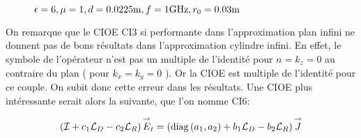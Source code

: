 \begin{figure}[!hbt]
          \caption[CIOE sur empilement de Hoppe & Rahmat-Samii p.~62]{\(\epsilon = 6, \mu = 1, d=0.0225\text{m}, f=1\text{GHz}, r_0=0.03\text{m}\)}
          \label{fig:imp_fourier:plan:hoppe:62:hoibc}
      \end{figure}


    On remarque que le CIOE CI3 si performante dans l'approximation plan infini ne donnent pas de bons résultats dans l’approximation cylindre infini. En effet, le symbole de l'opérateur n'est pas un multiple de l'identité pour \(n=k_z=0\) au contraire du plan ( pour \(k_x=k_y=0\) ). Or la CIOE est multiple de l'identité pour ce couple. On subit donc cette erreur dans les résultats. Une CIOE plus intéressante serait alors la suivante, que l'on nomme CI6:

    \begin{equation}
      \left({\mathcal{I}} + c_1{\mathcal{L}_D} -c_2{\mathcal{L}_R}\right){\overset{\rightarrow}{E}}_t = \left(\operatorname{diag}\left(a_1,a_2\right) + b_1{\mathcal{L}_D} - b_2 {\mathcal{L}_R} \right){\overset{\rightarrow}{J}}
    \end{equation}

